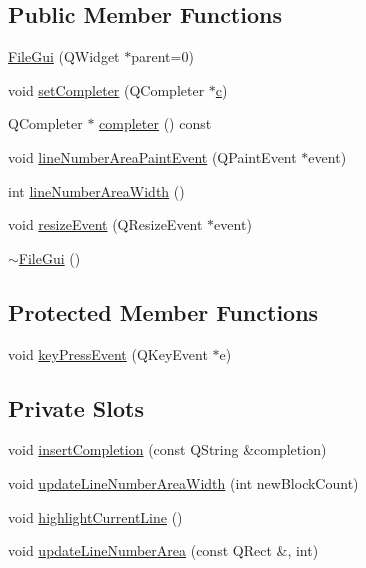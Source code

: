 \subsection*{Public Member Functions}
\begin{DoxyCompactItemize}
\item 
\hyperlink{class_file_gui_ac7c9b0cdbb2e89190a13318ec84c70a3}{File\-Gui} (Q\-Widget $\ast$parent=0)
\item 
void \hyperlink{class_file_gui_ab95b0b24bfee919e33bcf6c623c72842}{set\-Completer} (Q\-Completer $\ast$\hyperlink{class_file_gui_a71dfac2e67bf84af494667901b51ddc9}{c})
\item 
Q\-Completer $\ast$ \hyperlink{class_file_gui_a741c813e12ed8105bc9b30aa0a48c4d7}{completer} () const 
\item 
void \hyperlink{class_file_gui_a24940e7e57f49e81c451f137acfbe60a}{line\-Number\-Area\-Paint\-Event} (Q\-Paint\-Event $\ast$event)
\item 
int \hyperlink{class_file_gui_af5ea5edc018ed2ba6685ae6e5244483f}{line\-Number\-Area\-Width} ()
\item 
void \hyperlink{class_file_gui_a704d37c450e30eeb506a89f7e5b7a79e}{resize\-Event} (Q\-Resize\-Event $\ast$event)
\item 
\hyperlink{class_file_gui_a276b681a3fbd10e083463e32a361461c}{$\sim$\-File\-Gui} ()
\end{DoxyCompactItemize}
\subsection*{Protected Member Functions}
\begin{DoxyCompactItemize}
\item 
void \hyperlink{class_file_gui_aed2ed675e3d0eec814fda21479babb36}{key\-Press\-Event} (Q\-Key\-Event $\ast$e)
\end{DoxyCompactItemize}
\subsection*{Private Slots}
\begin{DoxyCompactItemize}
\item 
void \hyperlink{class_file_gui_a5b90c98b648fc77ef8474152e6632af3}{insert\-Completion} (const Q\-String \&completion)
\item 
void \hyperlink{class_file_gui_a498aa60814cc9265695e656e9b7a2e87}{update\-Line\-Number\-Area\-Width} (int new\-Block\-Count)
\item 
void \hyperlink{class_file_gui_a04e7291acb7167a70377f53dd7bd47f4}{highlight\-Current\-Line} ()
\item 
void \hyperlink{class_file_gui_ae1ce22662fb60a146101e8768acca3f1}{update\-Line\-Number\-Area} (const Q\-Rect \&, int)
\end{DoxyCompactItemize}
